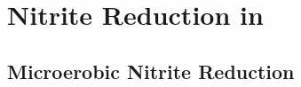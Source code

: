 \chapter{Nitrite Reduction in \Nm{}}
\label{chap:nitritereduction}


\section{Microerobic Nitrite Reduction}
